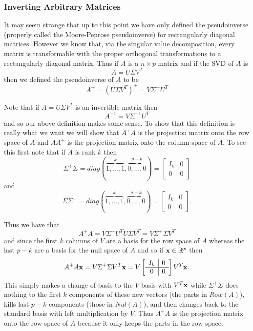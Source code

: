 \documentclass{book}
\begin{document}
\subsubsection{Inverting Arbitrary Matrices}

It may seem strange that up to this point we have only defined the pseudoinverse (properly called the Moore-Penrose pseudoinverse) for rectangularly diagonal matrices. However we know that, via the singular value decomposition, every matrix is transformable with the proper orthogonal transformations to a rectangularly diagonal matrix. Thus if $A$ is a $n \times p$ matrix and if the SVD of $A$ is 
$$
A=U\Sigma V^T
$$
then we defined the pseudoinverse of $A$ to be
$$
A^+=(U\Sigma V^T)^+=V\Sigma^+U^T
$$

Note that if $A=U\Sigma V^T$ is an invertible matrix then
$$
A^{-1}=V\Sigma^{-1}U^T
$$
and so our above definition makes some sense. To show that this definition is really what we want we will show that $A^+A$ is the projection matrix onto the row space of $A$ and $AA^+$ is the projection matrix onto the column space of $A$. To see this first note that if $A$ is rank $k$ then 
$$
\Sigma^+\Sigma=diag(\overset{k}{\overbrace{1,\ldots,1}},\overset{p-k}{\overbrace{0,\ldots,0}})=
\left[\begin{array}{c|c}
I_k& 0\\\hline
0& 0
\end{array}\right]
$$
and
$$
\Sigma\Sigma^+=diag(\overset{k}{\overbrace{1,\ldots,1}},\overset{n-k}{\overbrace{0,\ldots,0}})=
\left[\begin{array}{c|c}
I_k& 0\\\hline
0& 0
\end{array}\right].
$$

Thus we have that
$$
A^+A=V\Sigma^+U^TU\Sigma V^T=V\Sigma^+\Sigma V^T
$$
and since the first $k$ columns of $V$ are a basis for the row space of $A$ whereas the last $p-k$ are a basis for the null space of $A$ and so if ${\bf x} \in \mathbb{R}^p$ then
$$
A^+A{\bf x}=V\Sigma^+\Sigma V^T{\bf x}=V
\left[\begin{array}{c|c}
I_k& 0\\\hline
0& 0
\end{array}\right]
V^T{\bf x}.
$$
This simply makes a change of basis to the $V$ basis with $V^T{\bf x}$ while $\Sigma^+\Sigma$ does nothing to the first $k$ components of these new vectors (the parts in $Row(A)$), kills last $p-k$ components (those in $Nul(A)$), and then changes back to the standard basis with left multiplication by $V$. Thus $A^+A$ is the projection matrix onto the row space of $A$ because it only keeps the parts in the row space. 
\end{document}
